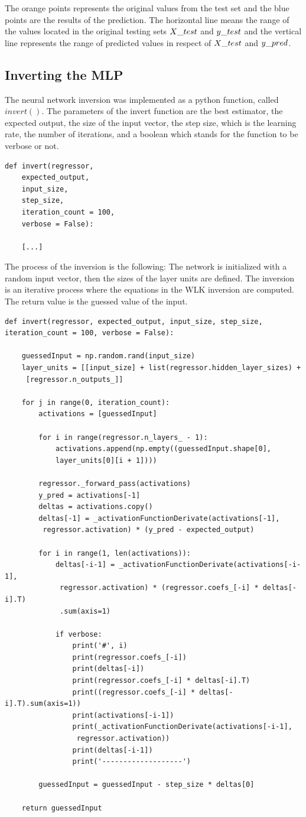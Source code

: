 The orange points represents the original values from the test set and the blue points are the results of the prediction. The horizontal line means the range of the values located in the original testing sets $X\char`_test$ and $y\char`_test$ and the vertical line represents the range of predicted values in respect of $X\char`_test$ and $y\char`_pred$.


\subsection{Inverting the MLP}

The neural network inversion was implemented as a python function, called $invert()$. The parameters of the invert function are the best estimator, the expected output, the size of the input vector, the step size, which is the learning rate, the number of iterations, and a boolean which stands for the function to be verbose or not.
\begin{lstlisting}
def invert(regressor, 
	expected_output, 
	input_size, 
	step_size, 
	iteration_count = 100, 
	verbose = False):
	
	[...]
\end{lstlisting}
The process of the inversion is the following: The network is initialized with a random input vector, then the sizes of the layer units are defined. The inversion is an iterative process where the equations in the WLK inversion are computed. The return value is the guessed value of the input.\medskip

\begin{lstlisting}
def invert(regressor, expected_output, input_size, step_size, iteration_count = 100, verbose = False):

	guessedInput = np.random.rand(input_size)
	layer_units = [[input_size] + list(regressor.hidden_layer_sizes) +
	 [regressor.n_outputs_]]
	 
	for j in range(0, iteration_count):
		activations = [guessedInput]
		
		for i in range(regressor.n_layers_ - 1):
			activations.append(np.empty((guessedInput.shape[0],
			layer_units[0][i + 1])))
			
		regressor._forward_pass(activations)
		y_pred = activations[-1]
		deltas = activations.copy()
		deltas[-1] = _activationFunctionDerivate(activations[-1],
		 regressor.activation) * (y_pred - expected_output)

		for i in range(1, len(activations)):
			deltas[-i-1] = _activationFunctionDerivate(activations[-i-1], 
			 regressor.activation) * (regressor.coefs_[-i] * deltas[-i].T)
			 .sum(axis=1)
			 
			if verbose:
				print('#', i)
				print(regressor.coefs_[-i])
				print(deltas[-i])
				print(regressor.coefs_[-i] * deltas[-i].T)
				print((regressor.coefs_[-i] * deltas[-i].T).sum(axis=1))
				print(activations[-i-1])
				print(_activationFunctionDerivate(activations[-i-1],
				 regressor.activation))
				print(deltas[-i-1])
				print('-------------------')
				
		guessedInput = guessedInput - step_size * deltas[0]
		
	return guessedInput
\end{lstlisting}

